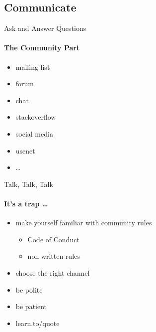 \documentclass{beamer}
\begin{document}
\subsection{Communicate}

\begin{frame}{Ask and Answer Questions}
    \framesubtitle{The Community Part}
    \begin{itemize}
        \item mailing list
        \item forum
        \item chat
        \item stackoverflow
        \item social media
        \item usenet
        \item \dots
    \end{itemize}
\end{frame}

\begin{frame}{Talk, Talk, Talk}
    \framesubtitle{It's a trap \dots}
    \begin{itemize}
        \item make yourself familiar with community rules
            \begin{itemize}
                \item Code of Conduct
                \item non written rules
            \end{itemize}
        \item choose the right channel
        \item be polite
        \item be patient
        \item learn.to/quote
    \end{itemize}
\end{frame}
\end{document}
